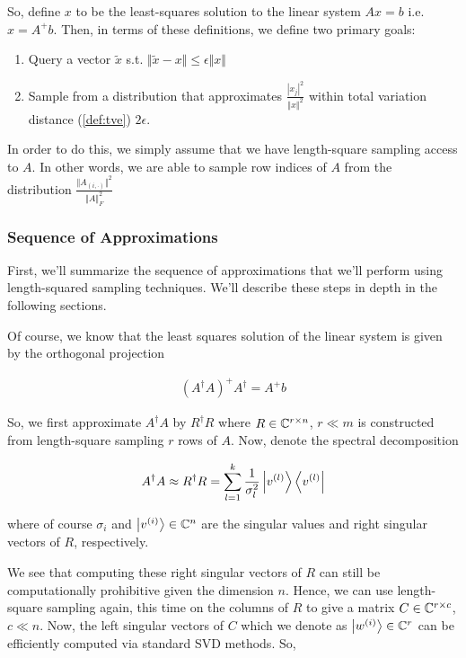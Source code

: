 \documentclass[main.tex]{subfiles}
\begin{document}
So, define $x$ to be the least-squares solution to the linear system $Ax = b$ i.e. $x = A^+ b$. Then, in terms of these definitions, we define two primary goals:

\begin{enumerate}
\item Query a vector $\tilde{x}$ s.t. $\Vert \tilde{x} - x \Vert \leq \epsilon \Vert x \Vert$
\item Sample from a distribution that approximates $\frac{|x_j|^2}{\Vert x \Vert^2}$ within total variation distance (\autoref{def:tve}) $2\epsilon$.
\end{enumerate}

In order to do this, we simply assume that we have length-square sampling access to $A$. In other words, we are able to sample row indices of $A$ from the distribution $\frac{\Vert A_{(i, \cdot)}\Vert^2}{\Vert A \Vert^2_F}$

\subsubsection{Sequence of Approximations}

First, we'll summarize the sequence of approximations that we'll perform using length-squared sampling techniques. We'll describe these steps in depth in the following sections.

Of course, we know that the least squares solution of the linear system is given by the orthogonal projection

\begin{align*}
	(A^\dag A)^+ A^\dag = A^+ b
\end{align*}

So, we first approximate $A^\dag A$ by $R^\dag R$ where $R \in \mathbb{C}^{r \times n}$, $r \ll m$ is constructed from length-square sampling $r$ rows of $A$. Now, denote the spectral decomposition 

\begin{align*}
A^\dag A \approx R^\dag R = \sum_{l=1}^k \frac{1}{\sigma_l^2}\ket{v^{(l)}}\bra{v^{(l)}}
\end{align*}

where of course $\sigma_i$ and $\ket{v^{(i)}} \in \mathbb{C}^n$ are the singular values and right singular vectors of $R$, respectively.

We see that computing these right singular vectors of $R$ can still be computationally prohibitive given the dimension $n$. Hence, we can use length-square sampling again, this time on the columns of $R$ to give a matrix $C \in \mathbb{C}^{r \times c}$, $c \ll n$. Now, the left singular vectors of $C$ which we denote as $\ket{w^{(i)}} \in \mathbb{C}^r$ can be efficiently computed via standard SVD methods. So,
\end{document}

